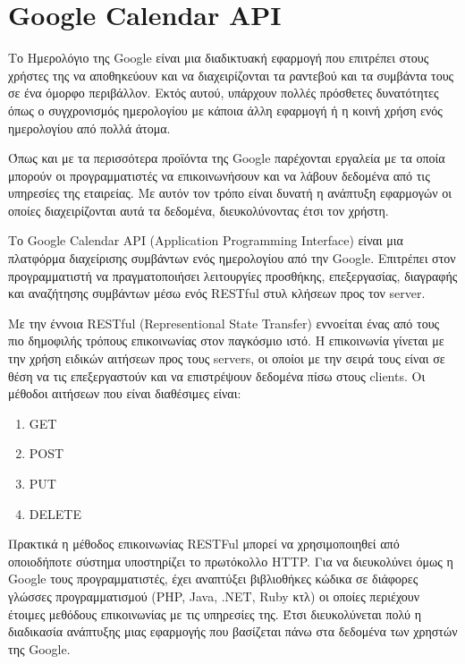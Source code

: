 
\chapter{Google Calendar API}
Το Ημερολόγιο της Google είναι μια διαδικτυακή εφαρμογή που επιτρέπει στους χρήστες της να αποθηκεύουν και να διαχειρίζονται τα ραντεβού και τα συμβάντα τους σε ένα όμορφο περιβάλλον. Εκτός αυτού, υπάρχουν πολλές πρόσθετες δυνατότητες όπως ο συγχρονισμός ημερολογίου με κάποια άλλη εφαρμογή ή η κοινή χρήση ενός ημερολογίου από 
πολλά άτομα.

Όπως και με τα περισσότερα προϊόντα της Google παρέχονται εργαλεία με τα οποία μπορούν οι προγραμματιστές να επικοινωνήσουν και να λάβουν δεδομένα από τις υπηρεσίες της εταιρείας. Με 
αυτόν τον τρόπο είναι δυνατή η ανάπτυξη εφαρμογών οι οποίες διαχειρίζονται αυτά τα δεδομένα, διευκολύνοντας έτσι τον χρήστη.

Το Google Calendar API (Application Programming Interface) 
είναι μια πλατφόρμα διαχείρισης συμβάντων ενός ημερολογίου από την Google. Επιτρέπει στον προγραμματιστή να πραγματοποιήσει λειτουργίες προσθήκης, επεξεργασίας, διαγραφής και αναζήτησης συμβάντων μέσω ενός RESTful στυλ κλήσεων προς τον server.

Με την έννοια RESTful (Representional State Transfer) εννοείται ένας από τους πιο δημοφιλής τρόπους επικοινωνίας στον παγκόσμιο ιστό. Η επικοινωνία γίνεται με την χρήση ειδικών αιτήσεων προς τους servers, οι οποίοι με την σειρά τους είναι σε θέση να τις επεξεργαστούν και να επιστρέψουν δεδομένα πίσω στους clients. Οι μέθοδοι αιτήσεων που είναι διαθέσιμες είναι:
\begin{enumerate}
\item GET
\item POST
\item PUT
\item DELETE
\end{enumerate}

Πρακτικά η μέθοδος επικοινωνίας RESTFul μπορεί να χρησιμοποιηθεί από οποιοδήποτε σύστημα υποστηρίζει το πρωτόκολλο HTTP. Για να διευκολύνει όμως η Google τους προγραμματιστές, έχει αναπτύξει βιβλιοθήκες κώδικα σε διάφορες γλώσσες προγραμματισμού (PHP, Java, .NET, Ruby κτλ) οι οποίες περιέχουν έτοιμες μεθόδους επικοινωνίας με τις υπηρεσίες της. Έτσι διευκολύνεται πολύ η διαδικασία ανάπτυξης μιας εφαρμογής που βασίζεται πάνω στα δεδομένα των χρηστών της Google.

